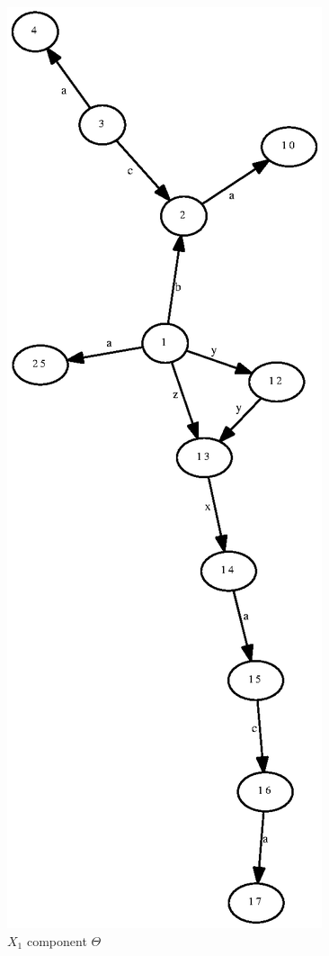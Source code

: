 \documentclass[a4paper,12pt]{article}
\numberwithin{equation}{section}
\numberwithin{figure}{section}
\begin{document}
\begin{figure}
\begin{center}
\includegraphics[scale=0.5, angle=90,bb=0 0 300 600]{python/ex_K_X.eps}
\caption{$X_1$ component $\Theta$}
\label{fig:KX}
\end{center}
\end{figure}
\end{document}
